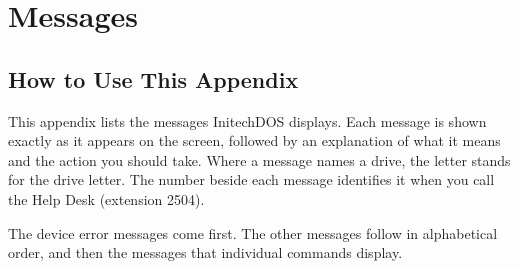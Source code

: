 \chapter{Messages}
\MessageDetailsOn

\section{How to Use This Appendix}
This appendix lists the messages InitechDOS displays.  Each message is shown
exactly as it appears on the screen, followed by an explanation of what it
means and the action you should take.  Where a message names a drive, the
letter  stands for the drive letter.  The number beside each message
identifies it when you call the Help Desk (extension 2504).

The device error messages come first.  The other messages follow in
alphabetical order, and then the messages that individual commands display.

